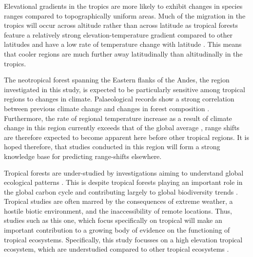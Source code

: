 \documentclass[a4paper,10pt,]{report}
\begin{document}
Elevational gradients in the tropics are more likely to exhibit changes in species ranges compared to topographically uniform areas. Much of the migration in the tropics will occur across altitude rather than across latitude as tropical forests feature a relatively strong elevation-temperature gradient compared to other latitudes and have a low rate of temperature change with latitude \citep{Malhi2010}. This means that cooler regions are much further away latitudinally than altitudinally in the tropics.

The neotropical forest spanning the Eastern flanks of the Andes, the region investigated in this study, is expected to be particularly sensitive among tropical regions to changes in climate. Palaeological records show a strong correlation between previous climate change and changes in forest composition \citep{Bush2004, Urrego2010}. Furthermore, the rate of regional temperature increase as a result of climate change in this region currently exceeds that of the global average \citep{Vuille2000}, range shifts are therefore expected to become apparent here before other tropical regions. It is hoped therefore, that studies conducted in this region will form a strong knowledge base for predicting range-shifts elsewhere.

Tropical forests are under-studied by investigations aiming to understand global ecological patterns \citep{Malhi2010}. This is despite tropical forests playing an important role in the global carbon cycle \citep{Davidson2012} and contributing largely to global biodiversity trends \citep{Gaston2000}. Tropical studies are often marred by the consequences of extreme weather, a hostile biotic environment, and the inaccessibility of remote locations. Thus, studies such as this one, which focus specifically on tropical will make an important contribution to a growing body of evidence on the functioning of tropical ecosystems. Specifically, this study focusses on a high elevation tropical ecosystem, which are understudied compared to other tropical ecosystems \citep{Bubb2004}.
\end{document}
